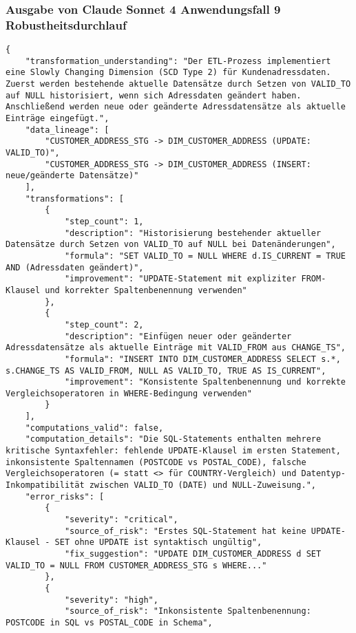 \subsubsection{Ausgabe von Claude Sonnet 4 Anwendungsfall 9 Robustheitsdurchlauf}\label{anhang:subsubsec:claude_case9_prompt3}
\begin{lstlisting}[caption={Ausgabe: Claude Sonnet 4 Anwendungsfall 9 Robustheitsdurchlauf},label={claude_case9_prompt3}]
{
    "transformation_understanding": "Der ETL-Prozess implementiert eine Slowly Changing Dimension (SCD Type 2) für Kundenadressdaten. Zuerst werden bestehende aktuelle Datensätze durch Setzen von VALID_TO auf NULL historisiert, wenn sich Adressdaten geändert haben. Anschließend werden neue oder geänderte Adressdatensätze als aktuelle Einträge eingefügt.",
    "data_lineage": [
        "CUSTOMER_ADDRESS_STG -> DIM_CUSTOMER_ADDRESS (UPDATE: VALID_TO)",
        "CUSTOMER_ADDRESS_STG -> DIM_CUSTOMER_ADDRESS (INSERT: neue/geänderte Datensätze)"
    ],
    "transformations": [
        {
            "step_count": 1,
            "description": "Historisierung bestehender aktueller Datensätze durch Setzen von VALID_TO auf NULL bei Datenänderungen",
            "formula": "SET VALID_TO = NULL WHERE d.IS_CURRENT = TRUE AND (Adressdaten geändert)",
            "improvement": "UPDATE-Statement mit expliziter FROM-Klausel und korrekter Spaltenbenennung verwenden"
        },
        {
            "step_count": 2,
            "description": "Einfügen neuer oder geänderter Adressdatensätze als aktuelle Einträge mit VALID_FROM aus CHANGE_TS",
            "formula": "INSERT INTO DIM_CUSTOMER_ADDRESS SELECT s.*, s.CHANGE_TS AS VALID_FROM, NULL AS VALID_TO, TRUE AS IS_CURRENT",
            "improvement": "Konsistente Spaltenbenennung und korrekte Vergleichsoperatoren in WHERE-Bedingung verwenden"
        }
    ],
    "computations_valid": false,
    "computation_details": "Die SQL-Statements enthalten mehrere kritische Syntaxfehler: fehlende UPDATE-Klausel im ersten Statement, inkonsistente Spaltennamen (POSTCODE vs POSTAL_CODE), falsche Vergleichsoperatoren (= statt <> für COUNTRY-Vergleich) und Datentyp-Inkompatibilität zwischen VALID_TO (DATE) und NULL-Zuweisung.",
    "error_risks": [
        {
            "severity": "critical",
            "source_of_risk": "Erstes SQL-Statement hat keine UPDATE-Klausel - SET ohne UPDATE ist syntaktisch ungültig",
            "fix_suggestion": "UPDATE DIM_CUSTOMER_ADDRESS d SET VALID_TO = NULL FROM CUSTOMER_ADDRESS_STG s WHERE..."
        },
        {
            "severity": "high",
            "source_of_risk": "Inkonsistente Spaltenbenennung: POSTCODE in SQL vs POSTAL_CODE in Schema",

\end{lstlisting}
